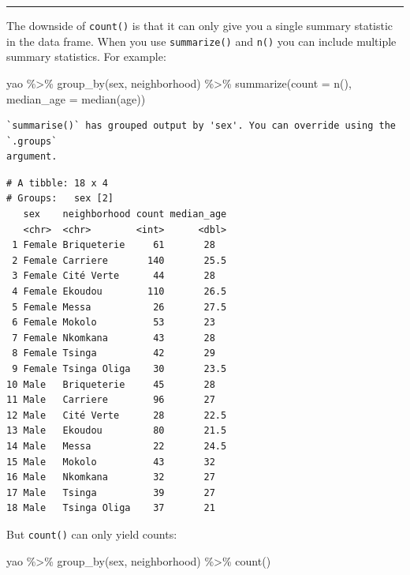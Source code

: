 \documentclass[
  letterpaper,
  DIV=11,
  numbers=noendperiod]{scrreprt}
\newenvironment{Shaded}{\begin{snugshade}}{\end{snugshade}}
\newcommand{\AttributeTok}[1]{\textcolor[rgb]{0.40,0.45,0.13}{#1}}
\newcommand{\FunctionTok}[1]{\textcolor[rgb]{0.28,0.35,0.67}{#1}}
\newcommand{\NormalTok}[1]{\textcolor[rgb]{0.00,0.23,0.31}{#1}}
\newcommand{\SpecialCharTok}[1]{\textcolor[rgb]{0.37,0.37,0.37}{#1}}
\begin{document}
\begin{center}\rule{0.5\linewidth}{0.5pt}\end{center}

The downside of \texttt{count()} is that it can only give you a single
summary statistic in the data frame. When you use \texttt{summarize()}
and \texttt{n()} you can include multiple summary statistics. For
example:

\begin{Shaded}
\begin{Highlighting}[]
\NormalTok{yao }\SpecialCharTok{\%\textgreater{}\%} 
  \FunctionTok{group\_by}\NormalTok{(sex, neighborhood) }\SpecialCharTok{\%\textgreater{}\%} 
  \FunctionTok{summarize}\NormalTok{(}\AttributeTok{count =} \FunctionTok{n}\NormalTok{(), }
            \AttributeTok{median\_age =} \FunctionTok{median}\NormalTok{(age))}
\end{Highlighting}
\end{Shaded}

\begin{verbatim}
`summarise()` has grouped output by 'sex'. You can override using the `.groups`
argument.
\end{verbatim}

\begin{verbatim}
# A tibble: 18 x 4
# Groups:   sex [2]
   sex    neighborhood count median_age
   <chr>  <chr>        <int>      <dbl>
 1 Female Briqueterie     61       28  
 2 Female Carriere       140       25.5
 3 Female Cité Verte      44       28  
 4 Female Ekoudou        110       26.5
 5 Female Messa           26       27.5
 6 Female Mokolo          53       23  
 7 Female Nkomkana        43       28  
 8 Female Tsinga          42       29  
 9 Female Tsinga Oliga    30       23.5
10 Male   Briqueterie     45       28  
11 Male   Carriere        96       27  
12 Male   Cité Verte      28       22.5
13 Male   Ekoudou         80       21.5
14 Male   Messa           22       24.5
15 Male   Mokolo          43       32  
16 Male   Nkomkana        32       27  
17 Male   Tsinga          39       27  
18 Male   Tsinga Oliga    37       21  
\end{verbatim}

But \texttt{count()} can only yield counts:

\begin{Shaded}
\begin{Highlighting}[]
\NormalTok{yao }\SpecialCharTok{\%\textgreater{}\%} 
  \FunctionTok{group\_by}\NormalTok{(sex, neighborhood) }\SpecialCharTok{\%\textgreater{}\%} 
  \FunctionTok{count}\NormalTok{()}
\end{Highlighting}
\end{Shaded}
\end{document}
